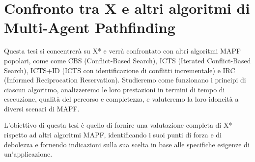 \documentclass{article}
\begin{document}
\section*{Confronto tra X e altri algoritmi di Multi-Agent Pathfinding}

Questa tesi si concentrerà su X* e verrà confrontato con altri algoritmi MAPF popolari, come come CBS (Conflict-Based Search), ICTS (Iterated Conflict-Based Search), ICTS+ID (ICTS con identificazione di conflitti incrementale) e IRC (Informed Reciprocation Reservation).
Studieremo come funzionano i principi di ciascun algoritmo, analizzeremo le loro prestazioni in termini di tempo di esecuzione, qualità del percorso e completezza, e valuteremo la loro idoneità a diversi scenari di MAPF. 

L'obiettivo di questa tesi è quello di fornire una valutazione completa di X* rispetto ad altri algoritmi MAPF, identificando i suoi punti di forza e di debolezza e fornendo indicazioni sulla sua scelta in base alle specifiche esigenze di un'applicazione.
\end{document}
